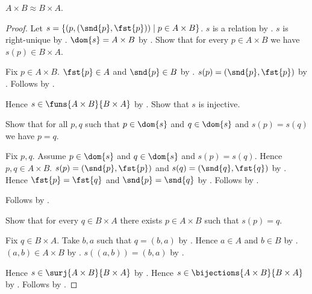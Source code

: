 \begin{proposition}\label{times_equinum_commutative}
    $A\times B\approx B\times A$.
\end{proposition}
\begin{proof}
    Let $s=\{(p,(\snd{p},\fst{p}))\mid p\in A\times B\}$.
    $s$ is a relation by .
    $s$ is right-unique by .
    $\dom{s}=A\times B$ by .
    Show that for every $p\in A\times B$ we have $s(p)\in B\times A$.
    \begin{subproof}
        Fix $p\in A\times B$.
        $\fst{p}\in A$ and $\snd{p}\in B$ by .
        $s(p)=(\snd{p},\fst{p})$ by .
        Follows by .
    \end{subproof}
    Hence $s\in\funs{A\times B}{B\times A}$ by .
    Show that $s$ is injective.
    \begin{subproof}
        Show that for all $p,q$ such that $p\in\dom{s}$ and
            $q\in\dom{s}$ and $s(p)=s(q)$ we have $p=q$.
        \begin{subproof}
            Fix $p,q$.
            Assume $p\in\dom{s}$ and $q\in\dom{s}$ and $s(p)=s(q)$.
            Hence $p,q\in A\times B$.
            $s(p)=(\snd{p},\fst{p})$ and
                $s(q)=(\snd{q},\fst{q})$
                by .
            Hence $\fst{p}=\fst{q}$ and $\snd{p}=\snd{q}$
                by .
            Follows by
                .
        \end{subproof}
        Follows by .
    \end{subproof}
    Show that for every $q\in B\times A$ there exists $p\in A\times B$
        such that $s(p)=q$.
    \begin{subproof}
        Fix $q\in B\times A$.
        Take $b,a$ such that $q=(b,a)$
            by .
        Hence $a\in A$ and $b\in B$ by .
        $(a,b)\in A\times B$ by .
        $s((a,b))=(b,a)$
            by .
    \end{subproof}
    Hence $s\in\surj{A\times B}{B\times A}$ by .
    Hence $s\in\bijections{A\times B}{B\times A}$
        by .
    Follows by .
\end{proof}

